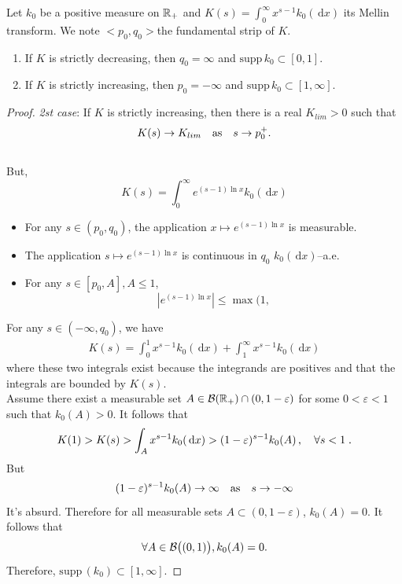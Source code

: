 \documentclass[11pt]{amsart}
\newcommand{\diff}{\,\mathrm{d}}
\newcommand{\supp}{\mathrm{supp}\,}
\begin{document}
\begin{lemma}Let $k_0$ be a positive measure on $\mathbb{R}_+$ and $K(s) = \int_0^\infty x^{s-1}k_0(\diff x)$ its Mellin transform. We note $<p_0,q_0>$the fundamental strip of $K$.
\begin{enumerate}
    \item If $K$ is strictly decreasing, then $q_0 = \infty$ and  $\supp k_0 \subset [0,1]$.
    \item If $K$ is strictly increasing, then $p_0 = -\infty$ and $\supp k_0 \subset [1, \infty]$.
\end{enumerate}
\end{lemma}
\begin{proof}
\textit{2st case}: If $K$ is strictly increasing, then there is a real $K_{lim} > 0$ such that $$K(s) \to K_{lim} \quad \text{as} \quad s \to p_0^+.$$\\
But, $$K(s) = \int_0^\infty e^{(s-1)\ln x} k_0(\diff x)$$
\begin{itemize}
    \item For any $s \in (p_0, q_0)$, the application $x \mapsto e^{(s-1)\ln x}$ is measurable. 
    \item The application $s \mapsto e^{(s-1)\ln x}$ is continuous in $q_0$ $k_0(\diff x)$--a.e.
    \item For any $s \in [p_0, A], A \leq 1$,
    $$|e^{(s-1)\ln x}|\leq \max(1,  $$
\end{itemize}

For any $s \in (-\infty, q_0)$, we have
\begin{align*}
    K(s) = \int_0^1 x^{s-1} k_0(\diff x) + \int_1^\infty x^{s-1} k_0(\diff x)
\end{align*}
where these two integrals exist because the integrands are positives and that the integrals are bounded by $K(s)$. \\

Assume there exist a measurable set $A \in \mathcal{B}(\mathbb{R}_+) \cap (0,1-\varepsilon)$ for some $0 < \varepsilon < 1$ such that $k_0(A) > 0$.  It follows that 
\begin{align*}
   K(1) > K(s) > \int_A x^{s-1} k_0(\diff x)
   > (1-\varepsilon)^{s-1} k_0(A)
   \,,\quad \forall s < 1
   \eqfinp
\end{align*}
But $$(1-\varepsilon)^{s-1} k_0(A) \to \infty \quad \text{as} \quad s \to -\infty$$
It's absurd. Therefore for all measurable sets $A \subset (0,1-\varepsilon)$, $k_0(A) = 0$. It follows that  
$$\forall A \in \mathcal{B}\big((0,1)\big), k_0(A) = 0.$$
Therefore, $\supp(k_0) \subset [1, \infty]$.
\end{proof}
\end{document}
